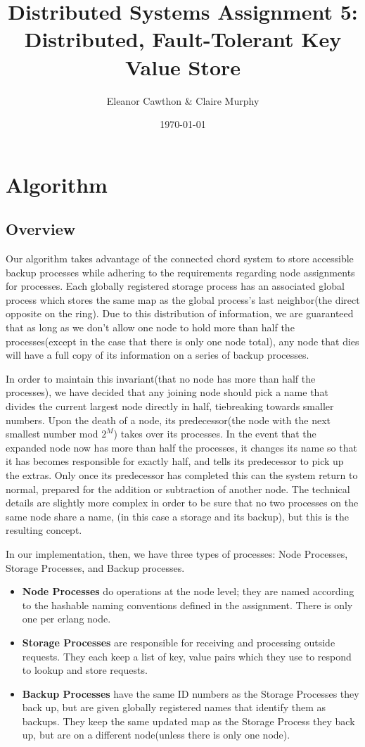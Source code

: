 \documentclass[a4paper]{article}
\title{Distributed Systems Assignment 5: Distributed, Fault-Tolerant Key Value Store}
\author{Eleanor Cawthon \& Claire Murphy}
\date{\today}
\begin{document}
\maketitle

\section{Algorithm}
\subsection{Overview}
Our algorithm takes advantage of the connected chord system to store accessible backup processes while adhering to the requirements regarding node assignments for processes. Each globally registered storage process has an associated global process which stores the same map as the global process's last neighbor(the direct opposite on the ring). Due to this distribution of information, we are guaranteed that as long as we don't allow one node to hold more than half the processes(except in the case that there is only one node total), any node that dies will have a full copy of its information on a series of backup processes.

In order to maintain this invariant(that no node has more than half the processes), we have decided that any joining node should pick a name that divides the current largest node directly in half, tiebreaking towards smaller numbers. Upon the death of a node, its predecessor(the node with the next smallest number mod $2^M$) takes over its processes. In the event that the expanded node now has more than half the processes, it changes its name so that it has becomes responsible for exactly half, and tells its predecessor to pick up the extras. Only once its predecessor has completed this can the system return to normal, prepared for the addition or subtraction of another node. The technical details are slightly more complex in order to be sure that no two processes on the same node share a name, (in this case a storage and its backup), but this is the resulting concept.

In our implementation, then, we have three types of processes: Node Processes, Storage Processes, and Backup processes.

\begin{itemize}
\item \textbf{Node Processes} do operations at the node level; they are named according to the hashable naming conventions defined in the assignment. There is only one per erlang node.
\item \textbf{Storage Processes} are responsible for receiving and processing outside requests. They each keep a list of {key, value} pairs which they use to respond to lookup and store requests.
\item \textbf{Backup Processes} have the same ID numbers as the Storage Processes they back up, but are given globally registered names that identify them as backups. They keep the same updated map as the Storage Process they back up, but are on a different node(unless there is only one node).
\end{itemize}
\end{document}
